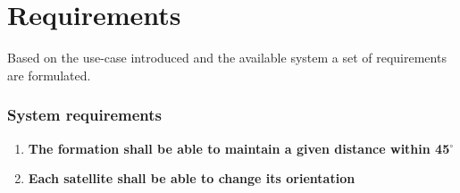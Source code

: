 \chapter{Requirements}\label{chap:requirements}
Based on the use-case introduced and the available system a set of requirements are formulated.
%
\subsection*{System requirements}
%
\begin{enumerate}
	\item \textbf{The formation shall be able to maintain a given distance within 45$^{\circ}$} 
		\item \textbf{Each satellite shall be able to change its orientation}
		
\end{enumerate}

